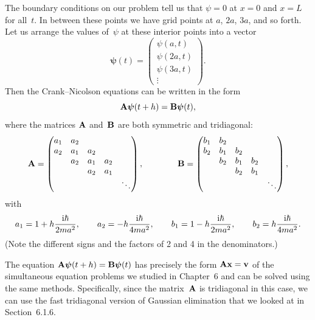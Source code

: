 \documentclass[12pt]{article}
\begin{document}
\begin{exercises}
The boundary conditions on our problem tell us that $\psi=0$ at
$x=0$ and $x=L$ for all~$t$.  In between these points we have grid points
at $a$, $2a$, $3a$, and so forth.  Let us arrange the values of~$\psi$ at
these interior points into a vector
\begin{displaymath}
\boldsymbol{\psi}(t)
  = \begin{pmatrix} \psi(a,t) \\ \psi(2a,t) \\ \psi(3a,t) \\ \vdots
    \end{pmatrix}.
\end{displaymath}
Then the Crank--Nicolson equations can be written in the form
\begin{displaymath}
\mathbf{A}\boldsymbol{\psi}(t+h) = \mathbf{B}\boldsymbol{\psi}(t),
\end{displaymath}
where the matrices $\mathbf{A}$ and~$\mathbf{B}$ are both symmetric and
tridiagonal:
\begin{displaymath}
\mathbf{A} = \begin{pmatrix} a_1 & a_2 \\
                          a_2 & a_1 & a_2 \\
                              & a_2 & a_1 & a_2 \\
                              &     & a_2 & a_1 \\
                              &     &     &     & \ddots
          \end{pmatrix},\qquad\qquad
\mathbf{B} = \begin{pmatrix} b_1 & b_2 \\
                          b_2 & b_1 & b_2 \\
                              & b_2 & b_1 & b_2 \\
                              &     & b_2 & b_1 \\
                              &     &     &     & \ddots
          \end{pmatrix},
\end{displaymath}
with
\begin{displaymath}
a_1 = 1 + h {\mathrm{i}\hbar\over2ma^2},\qquad
a_2 = - h {\mathrm{i}\hbar\over4ma^2},\qquad
b_1 = 1 - h {\mathrm{i}\hbar\over2ma^2},\qquad
b_2 = h {\mathrm{i}\hbar\over4ma^2}.
\end{displaymath}
(Note the different signs and the factors of 2 and 4 in the denominators.)

The equation $\mathbf{A}\boldsymbol{\psi}(t+h) = \mathbf{B}\boldsymbol{\psi}(t)$
has precisely the form $\mathbf{A}\mathbf{x} = \mathbf{v}$ of the simultaneous
equation problems we studied in Chapter~6 and can be solved using the same
methods.  Specifically, since the matrix~$\mathbf{A}$ is tridiagonal in this
case, we can use the fast tridiagonal version of Gaussian elimination that
we looked at in Section~6.1.6.


\end{exercises}
\end{document}
